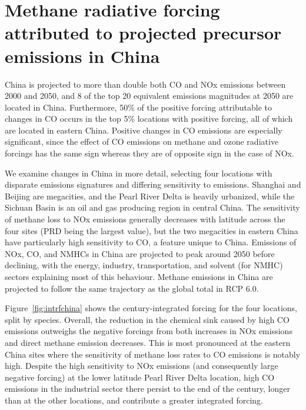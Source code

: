\section{Methane radiative forcing attributed to projected precursor emissions in China}

China is projected to more than double both CO and NOx emissions between 2000 and 2050, and 8 of the top 20 equivalent emissions magnitudes at 2050 are located in China. Furthermore, 50\% of the positive forcing attributable to changes in CO occurs in the top 5\% locations with positive forcing, all of which are located in eastern China. Positive changes in CO emissions are especially significant, since the effect of CO emissions on methane and ozone radiative forcings has the same sign whereas they are of opposite sign in the case of NOx.

We examine changes in China in more detail, selecting four locations with disparate emissions signatures and differing sensitivity to emissions. Shanghai and Beijing are megacities, and the Pearl River Delta is heavily urbanized, while the Sichuan Basin is an oil and gas producing region in central China. The sensitivity of methane loss to NOx emissions generally decreases with latitude across the four sites (PRD being the largest value), but the two megacities in eastern China have particularly high sensitivity to CO, a feature unique to China. Emissions of NOx, CO, and NMHCs in China are projected to peak around 2050 before declining, with the energy, industry, transportation, and solvent (for NMHC) sectors explaining most of this behaviour. Methane emissions in China are projected to follow the same trajectory as the global total in RCP 6.0.

Figure~\ref{fig:intrfchina} shows the century-integrated forcing for the four locations, split by species. Overall, the reduction in the chemical sink caused by high CO emissions outweighs the negative forcings from both increases in NOx emissions and direct methane emission decreases. This is most pronounced at the eastern China sites where the sensitivity of methane loss rates to CO emissions is notably high. Despite the high sensitivity to NOx emissions (and consequently large negative forcing) at the lower latitude Pearl River Delta location, high CO emissions in the industrial sector there persist to the end of the century, longer than at the other locations, and contribute a greater integrated forcing.